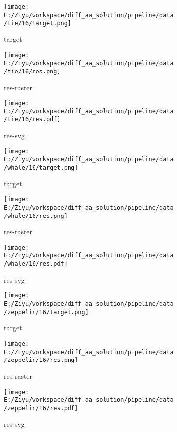 \documentclass{article}%
\begin{document}
%


\begin{figure}[H]%
\begin{subfigure}[b]{0.32\linewidth}%
\texttt{[image: E:/Ziyu/workspace/diff\_aa\_solution/pipeline/data/tie/16/target.png]}%
\caption{target}%
\end{subfigure}%
\begin{subfigure}[b]{0.32\linewidth}%
\texttt{[image: E:/Ziyu/workspace/diff\_aa\_solution/pipeline/data/tie/16/res.png]}%
\caption{res{-}raster}%
\end{subfigure}%
\begin{subfigure}[b]{0.32\linewidth}%
\texttt{[image: E:/Ziyu/workspace/diff\_aa\_solution/pipeline/data/tie/16/res.pdf]}%
\caption{res{-}svg}%
\end{subfigure}%
\par\vspace{1em}%
\caption{}%
\clearpage%
\end{figure}

%


\begin{figure}[H]%
\begin{subfigure}[b]{0.32\linewidth}%
\texttt{[image: E:/Ziyu/workspace/diff\_aa\_solution/pipeline/data/whale/16/target.png]}%
\caption{target}%
\end{subfigure}%
\begin{subfigure}[b]{0.32\linewidth}%
\texttt{[image: E:/Ziyu/workspace/diff\_aa\_solution/pipeline/data/whale/16/res.png]}%
\caption{res{-}raster}%
\end{subfigure}%
\begin{subfigure}[b]{0.32\linewidth}%
\texttt{[image: E:/Ziyu/workspace/diff\_aa\_solution/pipeline/data/whale/16/res.pdf]}%
\caption{res{-}svg}%
\end{subfigure}%
\par\vspace{1em}%
\caption{}%
\end{figure}

%


\begin{figure}[H]%
\begin{subfigure}[b]{0.32\linewidth}%
\texttt{[image: E:/Ziyu/workspace/diff\_aa\_solution/pipeline/data/zeppelin/16/target.png]}%
\caption{target}%
\end{subfigure}%
\begin{subfigure}[b]{0.32\linewidth}%
\texttt{[image: E:/Ziyu/workspace/diff\_aa\_solution/pipeline/data/zeppelin/16/res.png]}%
\caption{res{-}raster}%
\end{subfigure}%
\begin{subfigure}[b]{0.32\linewidth}%
\texttt{[image: E:/Ziyu/workspace/diff\_aa\_solution/pipeline/data/zeppelin/16/res.pdf]}%
\caption{res{-}svg}%
\end{subfigure}%
\par\vspace{1em}%
\caption{}%
\end{figure}

%
\end{document}
